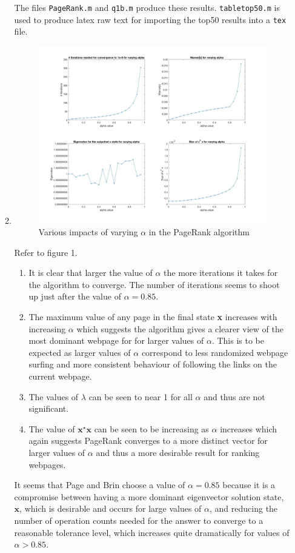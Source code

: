 \documentclass{article}
\begin{document}
\begin{enumerate}
\begin{enumerate}
			The files \texttt{PageRank.m} and \texttt{q1b.m} produce these results. \texttt{tabletop50.m} is used to produce latex raw text for importing the top50 results into a \texttt{tex} file.
		\item  
			\begin{figure}[h]
				\includegraphics[width = \textwidth]{fig_varyingalpha}
				\caption{Various impacts of varying $\alpha$ in the PageRank algorithm} 
			\end{figure}
			Refer to figure 1.
		\begin{enumerate}
			\item It is clear that larger the value of $\alpha$ the more iterations it takes for the algorithm to converge. The number of iterations seems to shoot up just after the value of $\alpha = 0.85$.
			\item The maximum value of any page in the final state \textbf{x} increases with increasing $\alpha$ which suggests the algorithm gives a clearer view of the most dominant webpage for for larger values of $\alpha$. This is to be expected as larger values of $\alpha$ correspond to less randomized webpage surfing and more consistent behaviour of following the links on the current webpage.
			\item The values of $\lambda$ can be seen to near 1 for all $\alpha$ and thus are not significant.
			\item The value of $\textbf{x}^\star \textbf{x}$ can be seen to be increasing as $\alpha$ increases which again suggests PageRank converges to a more distinct vector for larger values of $\alpha$ and thus a more desirable result for ranking webpages.
			\end{enumerate}
			It seems that Page and Brin choose a value of $\alpha = 0.85$ because it is a compromise between having a more dominant eigenvector solution state, $\textbf{x}$, which is desirable and occurs for large values of $\alpha$, and reducing the number of operation counts needed for the answer to converge to a reasonable tolerance level, which increases quite dramatically for values of $\alpha > 0.85$.
			

\end{enumerate}
\end{enumerate}
\end{document}
